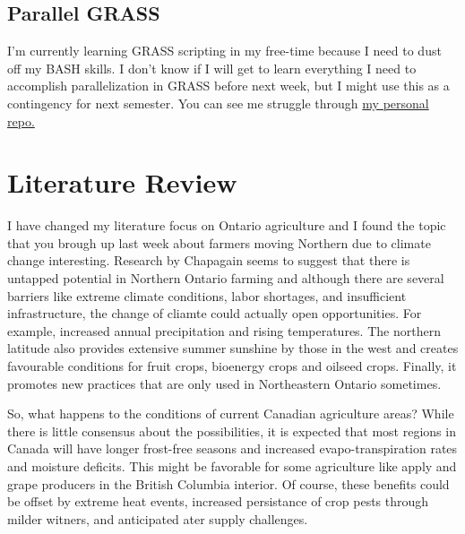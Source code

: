 \documentclass[a4paper,10pt]{article}
\begin{document}
\subsection{Parallel GRASS}
I'm currently learning GRASS scripting in my free-time because I need to dust off my BASH skills. I don't know if I will get to learn everything I need to accomplish parallelization in GRASS before next week, but I might use this as a contingency for next semester. You can see me struggle through \hyperlink{https://github.com/Leila-U/GRASS-bash}{my personal repo.}

\section{Literature Review}
I have changed my literature focus on Ontario agriculture and I found the topic that you brough up last week about farmers moving Northern due to climate change interesting. Research by Chapagain \cite{chapagain2017farming} seems to suggest that there is untapped potential in Northern Ontario farming and although there are several barriers like extreme climate conditions, labor shortages, and insufficient infrastructure, the change of cliamte could actually open opportunities. For example, increased annual precipitation and rising temperatures. The northern latitude also provides extensive summer sunshine by those in the west and creates favourable conditions for fruit crops, bioenergy crops and oilseed crops. Finally, it promotes new practices that are only used in Northeastern Ontario sometimes.

So, what happens to the conditions of current Canadian agriculture areas? While there is little consensus about the possibilities, it is expected that most regions in Canada will have longer frost-free seasons and increased evapo-transpiration rates and moisture deficits. This might be favorable for some agriculture like apply and grape producers in the British Columbia interior. Of course, these benefits could be offset by extreme heat events, increased persistance of crop pests through milder witners, and anticipated ater supply challenges. \cite{reid2007vulnerability}



\end{document}
